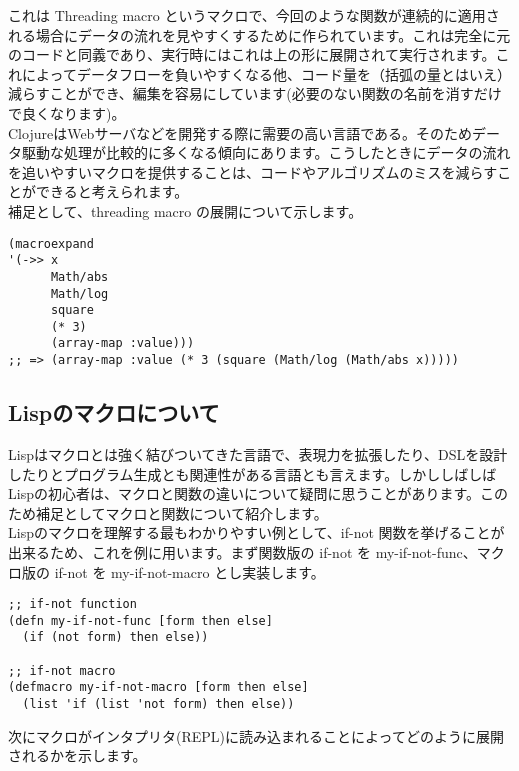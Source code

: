 \documentclass[a4paper, dvipdfmx, 12pt]{article}
\begin{document}
これは Threading macro というマクロで、今回のような関数が連続的に適用される場合にデータの流れを見やすくするために作られています。これは完全に元のコードと同義であり、実行時にはこれは上の形に展開されて実行されます。これによってデータフローを負いやすくなる他、コード量を（括弧の量とはいえ）減らすことができ、編集を容易にしています(必要のない関数の名前を消すだけで良くなります)。\\

ClojureはWebサーバなどを開発する際に需要の高い言語である。そのためデータ駆動な処理が比較的に多くなる傾向にあります。こうしたときにデータの流れを追いやすいマクロを提供することは、コードやアルゴリズムのミスを減らすことができると考えられます。\\

補足として、threading macro の展開について示します。\\
\begin{verbatim}
(macroexpand  
'(->> x 
      Math/abs 
      Math/log
      square 
      (* 3) 
      (array-map :value)))
;; => (array-map :value (* 3 (square (Math/log (Math/abs x)))))
\end{verbatim}

\subsection{Lispのマクロについて}
\label{sec:orgcf3ef3f}
Lispはマクロとは強く結びついてきた言語で、表現力を拡張したり、DSLを設計したりとプログラム生成とも関連性がある言語とも言えます。しかししばしばLispの初心者は、マクロと関数の違いについて疑問に思うことがあります。このため補足としてマクロと関数について紹介します。\\

Lispのマクロを理解する最もわかりやすい例として、if-not 関数を挙げることが出来るため、これを例に用います。まず関数版の if-not を my-if-not-func、マクロ版の if-not を my-if-not-macro とし実装します。\\

\begin{verbatim}
;; if-not function 
(defn my-if-not-func [form then else] 
  (if (not form) then else))

;; if-not macro 
(defmacro my-if-not-macro [form then else]
  (list 'if (list 'not form) then else))
\end{verbatim}

次にマクロがインタプリタ(REPL)に読み込まれることによってどのように展開されるかを示します。\\
\end{document}
